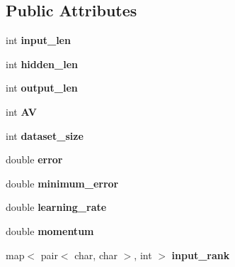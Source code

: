 \subsection*{Public Attributes}
\begin{DoxyCompactItemize}
\item 
\hypertarget{classNeural__Network_a9e5319bf385fa55bbbd8f0160915306d}{int {\bfseries input\-\_\-len}}\label{classNeural__Network_a9e5319bf385fa55bbbd8f0160915306d}

\item 
\hypertarget{classNeural__Network_a71cc8ca03da47fe639dd1e8ed518069c}{int {\bfseries hidden\-\_\-len}}\label{classNeural__Network_a71cc8ca03da47fe639dd1e8ed518069c}

\item 
\hypertarget{classNeural__Network_a053d2b510e07b1f25ef112f366bc62ba}{int {\bfseries output\-\_\-len}}\label{classNeural__Network_a053d2b510e07b1f25ef112f366bc62ba}

\item 
\hypertarget{classNeural__Network_a970136042929b26220d35be2776220a6}{int {\bfseries A\-V}}\label{classNeural__Network_a970136042929b26220d35be2776220a6}

\item 
\hypertarget{classNeural__Network_a8fe39196b36a38696abd679328dd8232}{int {\bfseries dataset\-\_\-size}}\label{classNeural__Network_a8fe39196b36a38696abd679328dd8232}

\item 
\hypertarget{classNeural__Network_a2ffe42aee798e268d4bbf0f3428ba430}{double {\bfseries error}}\label{classNeural__Network_a2ffe42aee798e268d4bbf0f3428ba430}

\item 
\hypertarget{classNeural__Network_aa2898d2ec7ac091b6d40916d4b113a93}{double {\bfseries minimum\-\_\-error}}\label{classNeural__Network_aa2898d2ec7ac091b6d40916d4b113a93}

\item 
\hypertarget{classNeural__Network_a1994986029a1ef9d55fa4bb1b440210b}{double {\bfseries learning\-\_\-rate}}\label{classNeural__Network_a1994986029a1ef9d55fa4bb1b440210b}

\item 
\hypertarget{classNeural__Network_a3a3ea713384da26e538bc60da8410a75}{double {\bfseries momentum}}\label{classNeural__Network_a3a3ea713384da26e538bc60da8410a75}

\item 
\hypertarget{classNeural__Network_a017bfc29054a46155cb89234aa2f69ee}{map$<$ pair$<$ char, char $>$, int $>$ {\bfseries input\-\_\-rank}}\label{classNeural__Network_a017bfc29054a46155cb89234aa2f69ee}


\end{DoxyCompactItemize}
